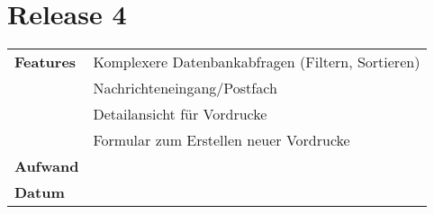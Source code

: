 \section*{Release 4}
\label{sec:release_4}

\begin{tabular}{p{5cm} p{9cm}}
    \textbf{Features} & Komplexere Datenbankabfragen (Filtern, Sortieren) \\
    & Nachrichteneingang/Postfach \\
    & Detailansicht für Vordrucke \\
    & Formular zum Erstellen neuer Vordrucke \\
    \hline
    \textbf{Aufwand} & \\
    \hline
    \textbf{Datum} & 
\end{tabular}
